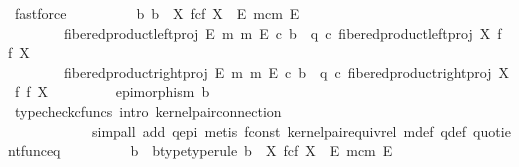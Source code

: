 \begin{isabellebody}
\ fastforce\isanewline
\ \ \ \ \ \ \isamarkupfalse%
\ \isamarkupfalse%
\ {\isachardoublequoteopen}{\isasymexists}{\isacharbang}{\kern0pt}b{\isachardot}{\kern0pt}\ b\ {\isacharcolon}{\kern0pt}\ X\ \isactrlbsub f\isactrlesub {\isasymtimes}\isactrlsub c\isactrlbsub f\isactrlesub \ X\ {\isasymrightarrow}\ E\ \isactrlbsub m\isactrlesub {\isasymtimes}\isactrlsub c\isactrlbsub m\isactrlesub \ E\ {\isasymand}\isanewline
\ \ \ \ \ \ \ \ fibered{\isacharunderscore}{\kern0pt}product{\isacharunderscore}{\kern0pt}left{\isacharunderscore}{\kern0pt}proj\ E\ m\ m\ E\ {\isasymcirc}\isactrlsub c\ b\ {\isacharequal}{\kern0pt}\ q\ {\isasymcirc}\isactrlsub c\ fibered{\isacharunderscore}{\kern0pt}product{\isacharunderscore}{\kern0pt}left{\isacharunderscore}{\kern0pt}proj\ X\ f\ f\ X\ {\isasymand}\isanewline
\ \ \ \ \ \ \ \ fibered{\isacharunderscore}{\kern0pt}product{\isacharunderscore}{\kern0pt}right{\isacharunderscore}{\kern0pt}proj\ E\ m\ m\ E\ {\isasymcirc}\isactrlsub c\ b\ {\isacharequal}{\kern0pt}\ q\ {\isasymcirc}\isactrlsub c\ fibered{\isacharunderscore}{\kern0pt}product{\isacharunderscore}{\kern0pt}right{\isacharunderscore}{\kern0pt}proj\ X\ f\ f\ X\ {\isasymand}\isanewline
\ \ \ \ \ \ \ \ epimorphism\ b{\isachardoublequoteclose}\isanewline
\ \ \ \ \ \ \ \ \isamarkupfalse%
\ {\isacharparenleft}{\kern0pt}typecheck{\isacharunderscore}{\kern0pt}cfuncs{\isacharcomma}{\kern0pt}\ intro\ kernel{\isacharunderscore}{\kern0pt}pair{\isacharunderscore}{\kern0pt}connection{\isacharcomma}{\kern0pt}\isanewline
\ \ \ \ \ \ \ \ \ \ \ \ simp{\isacharunderscore}{\kern0pt}all\ add{\isacharcolon}{\kern0pt}\ q{\isacharunderscore}{\kern0pt}epi{\isacharcomma}{\kern0pt}\ metis\ f{\isacharunderscore}{\kern0pt}const\ kernel{\isacharunderscore}{\kern0pt}pair{\isacharunderscore}{\kern0pt}equiv{\isacharunderscore}{\kern0pt}rel\ m{\isacharunderscore}{\kern0pt}def\ q{\isacharunderscore}{\kern0pt}def\ quotient{\isacharunderscore}{\kern0pt}func{\isacharunderscore}{\kern0pt}eq{\isacharparenright}{\kern0pt}\isanewline
\ \ \ \ \ \ \isamarkupfalse%
\ \isamarkupfalse%
\ b\ \ b{\isacharunderscore}{\kern0pt}type{\isacharbrackleft}{\kern0pt}type{\isacharunderscore}{\kern0pt}rule{\isacharbrackright}{\kern0pt}{\isacharcolon}{\kern0pt}\ {\isachardoublequoteopen}b\ {\isacharcolon}{\kern0pt}\ X\ \isactrlbsub f\isactrlesub {\isasymtimes}\isactrlsub c\isactrlbsub f\isactrlesub \ X\ {\isasymrightarrow}\ E\ \isactrlbsub m\isactrlesub {\isasymtimes}\isactrlsub c\isactrlbsub m\isactrlesub \ E{\isachardoublequoteclose}\ \isanewline

\end{isabellebody}
